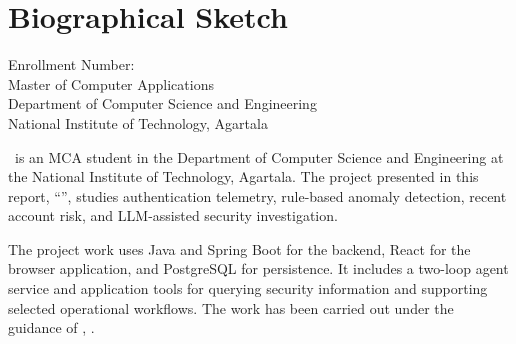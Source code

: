 \chapter{Biographical Sketch}
\begin{center}
{\Large\bfseries\CandidateName}\par
\vspace{0.3cm}
Enrollment Number: \RollNumber\\
Master of Computer Applications\\
Department of Computer Science and Engineering\\
National Institute of Technology, Agartala
\end{center}
\vspace{0.6cm}
\CandidateName\ is an MCA student in the Department of Computer Science and Engineering at the National Institute of Technology, Agartala. The project presented in this report, ``\ReportTitle'', studies authentication telemetry, rule-based anomaly detection, recent account risk, and LLM-assisted security investigation.

The project work uses Java and Spring Boot for the backend, React for the browser application, and PostgreSQL for persistence. It includes a two-loop agent service and application tools for querying security information and supporting selected operational workflows. The work has been carried out under the guidance of \SupervisorName, \SupervisorDesignation.
